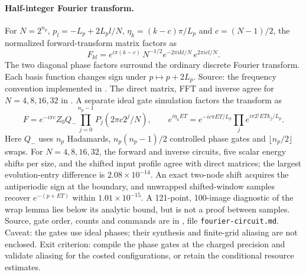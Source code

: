 \documentclass[11pt,a4paper]{article}
\begin{document}
\paragraph{Half-integer Fourier transform.}
For $N=2^{n_p}$, $p_l=-L_p+2L_pl/N$, $\eta_k=(k-c)\pi/L_p$ and
$c=(N-1)/2$, the normalized forward-transform matrix factors as
\[
 F_{kl}=e^{i\pi(k-c)}\,N^{-1/2}e^{-2\pi ikl/N}\,e^{2\pi icl/N}.
\]
The two diagonal phase factors surround the ordinary discrete Fourier
transform. Each basis function changes sign under $p\mapsto p+2L_p$.
Source: the frequency convention implemented in
. The direct matrix, FFT and inverse
agree for $N=4,8,16,32$ in .
A separate ideal gate simulation factors the transform as
\[
 F=e^{-i\pi c}Z_0 Q_-\prod_{j=0}^{n_p-1}P_j(2\pi c2^j/N),\qquad
 e^{i\eta_kET}=e^{-ic\pi ET/L_p}\prod_j e^{i\pi2^jET k_j/L_p}.
\]
Here $Q_-$ uses $n_p$ Hadamards, $n_p(n_p-1)/2$ controlled phase gates
and $\lfloor n_p/2\rfloor$ swaps. For $N=4,8,16,32$, the forward and
inverse circuits, five scalar energy shifts per size, and the shifted input
profile agree with direct matrices; the largest evolution-entry difference is
$2.08\times10^{-14}$. An exact two-node shift acquires the antiperiodic sign
at the boundary, and unwrapped shifted-window samples recover $e^{-(p+ET)}$
within $1.01\times10^{-15}$. A 121-point, 100-image diagnostic of the
wrap lemma lies below its analytic bound, but is not a proof between samples.
Source, gate order, counts and commands are in ,
file \texttt{fourier-circuit.md}. Caveat: the gates use ideal phases; their
synthesis and finite-grid aliasing are not enclosed. Exit criterion: compile
the phase gates at the charged precision and validate aliasing for the costed
configurations, or retain the conditional resource estimates.
\end{document}
